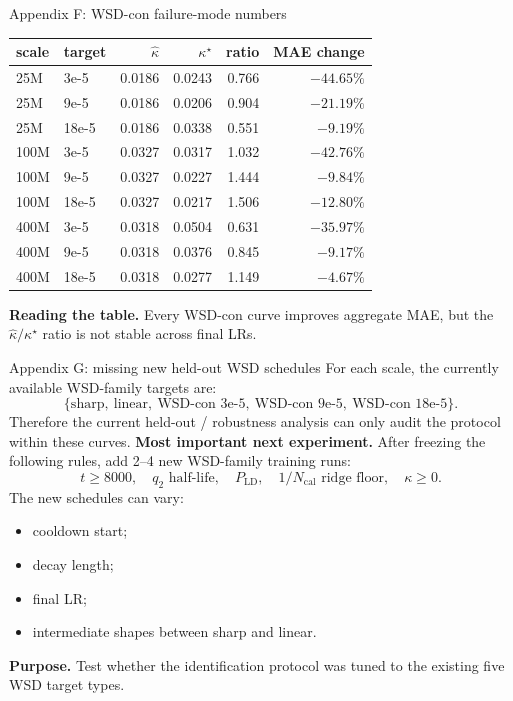 \documentclass[9pt,aspectratio=169]{beamer}
\newcommand{\tightlist}{\setlength{\itemsep}{2pt}\setlength{\parskip}{0pt}}
\begin{document}
\begin{frame}{Appendix F: WSD-con failure-mode numbers}
\scriptsize
\begin{center}
\begin{tabular}{llrrrr}
\toprule
scale & target & \(\widehat\kappa\) & \(\kappa^\star\) & ratio & MAE change\\
\midrule
25M & 3e-5 & 0.0186 & 0.0243 & 0.766 & \(-44.65\%\)\\
25M & 9e-5 & 0.0186 & 0.0206 & 0.904 & \(-21.19\%\)\\
25M & 18e-5 & 0.0186 & 0.0338 & 0.551 & \(-9.19\%\)\\
100M & 3e-5 & 0.0327 & 0.0317 & 1.032 & \(-42.76\%\)\\
100M & 9e-5 & 0.0327 & 0.0227 & 1.444 & \(-9.84\%\)\\
100M & 18e-5 & 0.0327 & 0.0217 & 1.506 & \(-12.80\%\)\\
400M & 3e-5 & 0.0318 & 0.0504 & 0.631 & \(-35.97\%\)\\
400M & 9e-5 & 0.0318 & 0.0376 & 0.845 & \(-9.17\%\)\\
400M & 18e-5 & 0.0318 & 0.0277 & 1.149 & \(-4.67\%\)\\
\bottomrule
\end{tabular}
\end{center}
\vfill
\small
\textbf{Reading the table.}
Every WSD-con curve improves aggregate MAE,
but the \(\widehat\kappa/\kappa^\star\) ratio is not stable across final LRs.
\end{frame}

\begin{frame}{Appendix G: missing new held-out WSD schedules}
\small
For each scale, the currently available WSD-family targets are:
\[
\{\text{sharp},\ \text{linear},\ \text{WSD-con 3e-5},\ \text{WSD-con 9e-5},\ \text{WSD-con 18e-5}\}.
\]
Therefore the current held-out / robustness analysis can only audit the protocol within these curves.
\vfill
\textbf{Most important next experiment.}
After freezing the following rules, add 2--4 new WSD-family training runs:
\[
t\ge8000,\quad
q_2\text{ half-life},\quad
P_{\mathrm{LD}},\quad
1/N_{\mathrm{cal}}\text{ ridge floor},\quad
\kappa\ge0.
\]
The new schedules can vary:
\begin{itemize}\tightlist
\item cooldown start;
\item decay length;
\item final LR;
\item intermediate shapes between sharp and linear.
\end{itemize}
\vfill
\textbf{Purpose.}
Test whether the identification protocol was tuned to the existing five WSD target types.
\end{frame}
\end{document}
